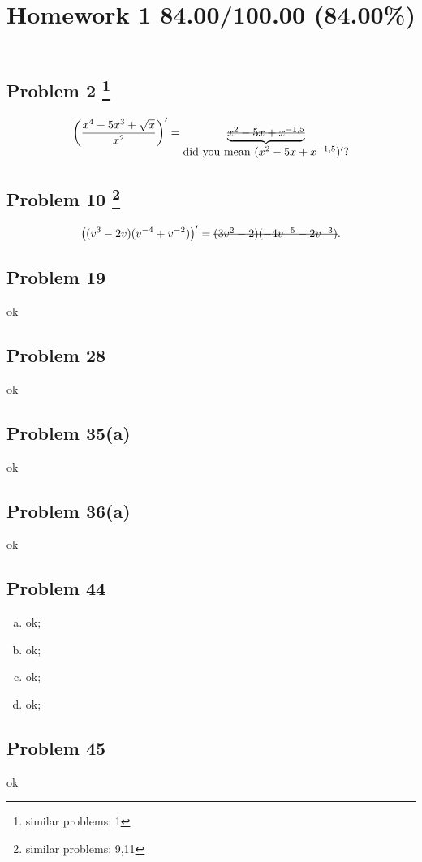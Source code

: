 \documentclass[10pt]{article} %
\title{Homework 1 84.00/100.00 (84.00\%)}
\begin{document}
\maketitle

\subsection*{Problem 2  \footnote{similar problems: 1}}
\begin{equation*}
	\left( 
\frac{x^4-5x^3+\sqrt{x}}{x^2}
	\right)
  '=\underbrace{\mbox{\sout{$x^2-5x+x^{-1,5}$}}}_{\mbox{did you mean $(x^2-5x+x^{-1,5})'$?}}
\end{equation*}
\subsection*{Problem 10 \footnote{similar problems: 9,11}}
\begin{equation*}
	\left( (v^3-2v)(v^{-4}+v^{-2}) \right)'=\mbox{\sout{$(3v^2-2)(-4v^{-5}-2v^{-3})$}}.
\end{equation*}
\subsection*{Problem 19 }
ok
\subsection*{Problem 28 }
ok
\subsection*{Problem 35(a) }
ok
\subsection*{Problem 36(a) }
ok
\subsection*{Problem 44 }
\begin{enumerate}[(a)]
	\item ok;
	\item ok;
	\item ok;
	\item ok;
\end{enumerate}
\subsection*{Problem 45 }
ok
\end{document}
